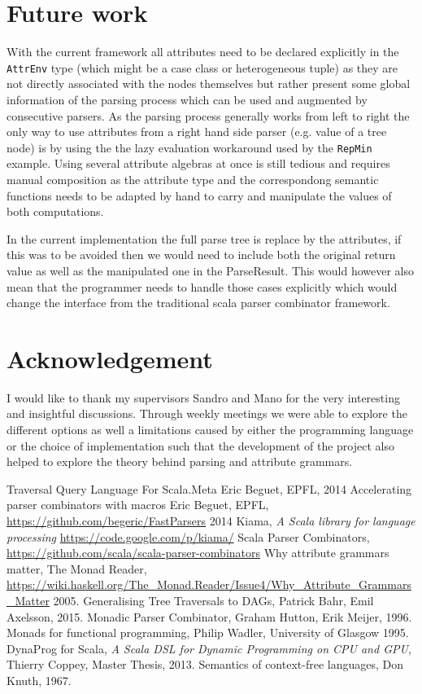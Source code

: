 \section{Future work}
With the current framework all attributes need to be declared explicitly in the \verb/AttrEnv/ type (which might be a case class or heterogeneous tuple) as they are not directly associated with the nodes themselves but rather present some global information of the parsing process which can be used and augmented by consecutive parsers.
As the parsing process generally works from left to right the only way to use attributes from a right hand side parser (e.g. value of a tree node) is by using the the lazy evaluation workaround used by the \verb/RepMin/ example.
Using several attribute algebras at once is still tedious and requires manual composition as the attribute type and the correspondong semantic functions needs to be adapted by hand to carry and manipulate the values of both computations.

In the current implementation the full parse tree is replace by the attributes, if this was to be avoided then we would need to include both the original return value as well as the manipulated one in the ParseResult. This would however also mean that the programmer needs to handle those cases explicitly which would change the interface from the traditional scala parser combinator framework.

\section{Acknowledgement}
I would like to thank my supervisors Sandro and Mano for the very interesting and insightful discussions. Through weekly meetings we were able to explore the different options as well a limitations caused by either the programming language or the choice of implementation such that the development of the project also helped to explore the theory behind parsing and attribute grammars.

\begin{thebibliography}{9}
  Traversal Query Language For Scala.Meta
  Eric Beguet, EPFL,
  2014
  Accelerating parser combinators with macros
  Eric Beguet, EPFL,
  \url{https://github.com/begeric/FastParsers}
  2014
  Kiama,
  \emph{A Scala library for language processing}
  \url{https://code.google.com/p/kiama/}
  Scala Parser Combinators,
  \url{https://github.com/scala/scala-parser-combinators}
  Why attribute grammars matter,
  The Monad Reader,
  \url{https://wiki.haskell.org/The_Monad.Reader/Issue4/Why_Attribute_Grammars_Matter}
  2005.
  Generalising Tree Traversals to DAGs,
  Patrick Bahr, Emil Axelsson,
  2015.
  Monadic Parser Combinator,
  Graham Hutton, Erik Meijer,
  1996.
  Monads for functional programming,
  Philip Wadler, University of Glasgow
  1995.
  DynaProg for Scala,
  \emph{A Scala DSL for Dynamic Programming on CPU and GPU},
  Thierry Coppey, Master Thesis,
  2013.
  Semantics of context-free languages,
  Don Knuth,
  1967.
\end{thebibliography}

